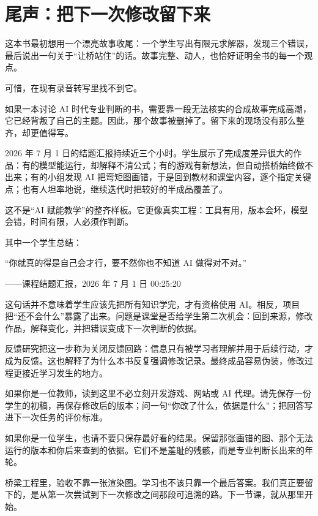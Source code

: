 \chapter*{尾声：把下一次修改留下来}

这本书最初想用一个漂亮故事收尾：一个学生写出有限元求解器，发现三个错误，最后说出一句关于“让桥站住”的话。故事完整、动人，也恰好证明全书的每一个观点。

可惜，在现有录音转写里找不到它。

如果一本讨论 AI 时代专业判断的书，需要靠一段无法核实的合成故事完成高潮，它已经背叛了自己的主题。因此，那个故事被删掉了。留下来的现场没有那么整齐，却更值得写。

2026 年 7 月 1 日的结题汇报持续近三个小时。学生展示了完成度差异很大的作品：有的模型能运行，却解释不清公式；有的游戏有新想法，但自动搭桥始终做不出来；有的小组发现 AI 把弯矩图画错，于是回到教材和课堂内容，逐个指定关键点；也有人坦率地说，继续迭代时把较好的半成品覆盖了。

这不是“AI 赋能教学”的整齐样板。它更像真实工程：工具有用，版本会坏，模型会错，时间有限，人必须作判断。

其中一个学生总结：

\begin{shiyu-inline}
``你就真的得是自己会才行，要不然你也不知道 AI 做得对不对。''

\hfill ——课程结题汇报，2026 年 7 月 1 日 00:25:20
\end{shiyu-inline}

这句话并不意味着学生应该先把所有知识学完，才有资格使用 AI。相反，项目把“还不会什么”暴露了出来。问题是课堂是否给学生第二次机会：回到来源，修改作品，解释变化，并把错误变成下一次判断的依据。

反馈研究把这一步称为关闭反馈回路：信息只有被学习者理解并用于后续行动，才成为反馈\cite{carless2019spirals}。这也解释了为什么本书反复强调修改记录。最终成品容易伪装，修改过程更接近学习发生的地方。

如果你是一位教师，读到这里不必立刻开发游戏、网站或 AI 代理。请先保存一份学生的初稿，再保存修改后的版本；问一句“你改了什么，依据是什么”；把回答写进下一次任务的评价标准。

如果你是一位学生，也请不要只保存最好看的结果。保留那张画错的图、那个无法运行的版本和你后来查到的依据。它们不是羞耻的残骸，而是专业判断长出来的年轮。

\enlargethispage{2\baselineskip}
桥梁工程里，验收不靠一张渲染图。学习也不该只靠一个最后答案。我们真正要留下的，是从第一次尝试到下一次修改之间那段可追溯的路。下一节课，就从那里开始。
